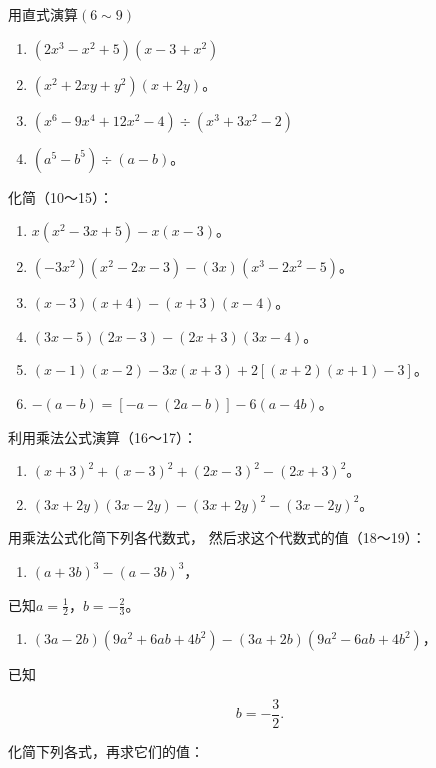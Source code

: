 用直式演算\((6\sim 9)\)

\begin{enumerate}[start=6]
\item
  \((2x^{3} - x^{2} + 5)(x - 3 + x^{2})\)
\item
  \((x^{2} + 2xy + y^{2})(x + 2y)\)。
\item
  \((x^{6} - 9x^{4} + 12x^{2} - 4)\div (x^{3} + 3x^{2} - 2)\)
\item
  \((a^5 - b^5) \div (a - b)\)。
\end{enumerate}

化简（10～15）：

\begin{enumerate}[start=10]
\item
  \(x(x^{2} - 3x + 5) - x(x - 3)\)。
\item
  \((-3x^{2})(x^{2} - 2x - 3) - (3x)(x^{3} - 2x^{2} - 5)\)。
\item
  \((x - 3)(x + 4) - (x + 3)(x - 4)\)。
\item
  \((3x - 5)(2x - 3) - (2x + 3)(3x - 4)\)。
\item
  \((x - 1)(x - 2) - 3x(x + 3) + 2[(x + 2)(x + 1) - 3]\)。
\item
  \(-(a - b) = [-a - (2a - b)] - 6(a - 4b)\)。
\end{enumerate}

利用乘法公式演算（16～17）：

\begin{enumerate}[start=16]
\item
  \((x + 3)^{2} + (x - 3)^{2} + (2x - 3)^{2} - (2x + 3)^{2}\)。
\item
  \((3x + 2y)(3x - 2y) - (3x + 2y)^{2} - (3x - 2y)^{2}\)。
\end{enumerate}

用乘法公式化简下列各代数式，
然后求这个代数式的值（18～19）：

\begin{enumerate}[start=18]
\item
  \((a + 3b)^{3} - (a - 3b)^{3}\)，
\end{enumerate}
已知\(a = \frac{1}{2}\)，\(b = -\frac{2}{3}\)。

\begin{enumerate}[start=19]
\item
  \((3a - 2b)(9a^2 + 6ab + 4b^2) - (3a + 2b)(9a^2 - 6ab + 4b^2)\)，
\end{enumerate}
已知

\[
b = - \frac{3}{2}.
\]

化简下列各式，再求它们的值：

